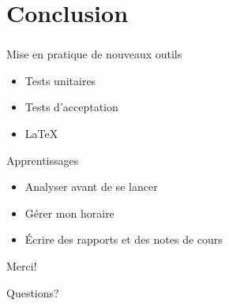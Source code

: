 \documentclass{beamer}
\begin{document}
  \section[Conclusion]{Conclusion}
  \begin{frame}
  \frametitle{\insertsection}
  \begin{block}{Mise en pratique de nouveaux outils}
  \begin{itemize}
    \item Tests unitaires
    \item Tests d'acceptation
    \item \LaTeX
  \end{itemize}
  \end{block}

  \vfill
  
  \begin{block}{Apprentissages}
  \begin{itemize}
    \item Analyser avant de se lancer
    \item G\'erer mon horaire
    \item \'Ecrire des rapports et des notes de cours
  \end{itemize}
  \end{block}
  \vfill
  \end{frame}
  
  \begin{frame}
  \begin{center}
  \Huge Merci!
  \end{center}

  \vfill

  \begin{center}
  \Huge Questions?
  \end{center}
  \vfill
  \end{frame}
\end{document}
